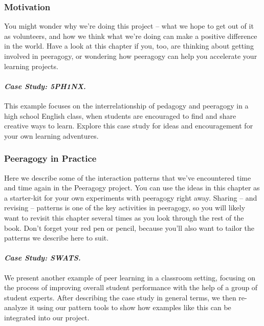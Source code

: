 \hypertarget{motivation}{%
\subsubsection{Motivation}\label{motivation}}

You might wonder why we're doing this project -- what we hope to get out
of it as volunteers, and how we think what we're doing can make a
positive difference in the world. Have a look at this chapter if you,
too, are thinking about getting involved in peeragogy, or wondering how
peeragogy can help you accelerate your learning projects.

\hypertarget{case-study-5ph1nx.}{%
\paragraph{\texorpdfstring{\emph{Case Study:
5PH1NX.}}{Case Study: 5PH1NX.}}\label{case-study-5ph1nx.}}

This example focuses on the interrelationship of pedagogy and peeragogy
in a high school English class, when students are encouraged to find and
share creative ways to learn. Explore this case study for ideas and
encouragement for your own learning adventures.

\hypertarget{peeragogy-in-practice}{%
\subsubsection{Peeragogy in Practice}\label{peeragogy-in-practice}}

Here we describe some of the interaction patterns that we've encountered
time and time again in the Peeragogy project. You can use the ideas in
this chapter as a starter-kit for your own experiments with peeragogy
right away. Sharing -- and revising -- patterns is one of the key
activities in peeragogy, so you will likely want to revisit this chapter
several times as you look through the rest of the book. Don't forget
your red pen or pencil, because you'll also want to tailor the patterns
we describe here to suit.

\hypertarget{case-study-swats.}{%
\paragraph{\texorpdfstring{\emph{Case Study:
SWATS.}}{Case Study: SWATS.}}\label{case-study-swats.}}

We present another example of peer learning in a classroom setting,
focusing on the process of improving overall student performance with
the help of a group of student experts. After describing the case study
in general terms, we then re-analyze it using our pattern tools to show
how examples like this can be integrated into our project.

